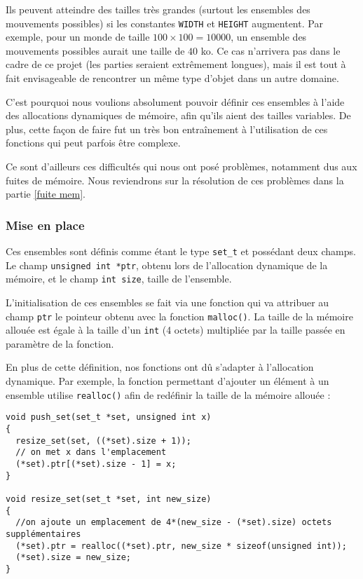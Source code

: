 \documentclass[a4paper]{article}
\begin{document}
Ils peuvent atteindre des tailles très grandes (surtout les ensembles des mouvements possibles) si les constantes \verb|WIDTH| et \verb|HEIGHT| augmentent. Par exemple, pour un monde de taille $100 \times 100 = 10000$, un ensemble des mouvements possibles aurait une taille de $40$ ko. Ce cas n'arrivera pas dans le cadre de ce projet (les parties seraient extrêmement longues), mais il est tout à fait envisageable de rencontrer un même type d'objet dans un autre domaine.

C'est pourquoi nous voulions absolument pouvoir définir ces ensembles à l'aide des allocations dynamiques de mémoire, afin qu'ils aient des tailles variables. De plus, cette façon de faire fut un très bon entraînement à l'utilisation de ces fonctions qui peut parfois être complexe.

Ce sont d'ailleurs ces difficultés qui nous ont posé problèmes, notamment dus aux fuites de mémoire. Nous reviendrons sur la résolution de ces problèmes dans la partie \ref{fuite mem}.

\subsubsection{Mise en place}
\label{mep malloc}

Ces ensembles sont définis comme étant le type \verb|set_t| et possédant deux champs. Le champ \verb|unsigned int *ptr|, obtenu lors de l'allocation dynamique de la mémoire, et le champ \verb|int size|, taille de l'ensemble. 

L'initialisation de ces ensembles se fait via une fonction qui va attribuer au champ \verb|ptr| le pointeur obtenu avec la fonction \verb|malloc()|. La taille de la mémoire allouée est égale à la taille d'un \verb|int| (4 octets) multipliée par la taille passée en paramètre de la fonction.

En plus de cette définition, nos fonctions ont dû s'adapter à l'allocation dynamique. Par exemple, la fonction permettant d'ajouter un élément à un ensemble utilise \verb|realloc()| afin de redéfinir la taille de la mémoire allouée :

\begin{verbatim}
void push_set(set_t *set, unsigned int x)
{
  resize_set(set, ((*set).size + 1));
  // on met x dans l'emplacement
  (*set).ptr[(*set).size - 1] = x;
}

void resize_set(set_t *set, int new_size)
{
  //on ajoute un emplacement de 4*(new_size - (*set).size) octets supplémentaires
  (*set).ptr = realloc((*set).ptr, new_size * sizeof(unsigned int));
  (*set).size = new_size;
}
\end{verbatim}
\end{document}
